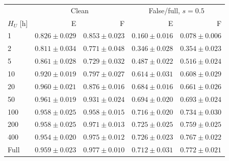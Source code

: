 \begin{tabular*}{\columnwidth}{@{\extracolsep{\fill}}lrrrr@{}}
\toprule
& \multicolumn{2}{c}{Clean} & \multicolumn{2}{c}{False/full, $s=0.5$} \\
$H_U$ [h] & E & F & E & F \\
\midrule
1 & $0.826\pm0.029$ & $0.853\pm0.023$ & $0.160\pm0.016$ & $0.078\pm0.006$ \\
2 & $0.811\pm0.034$ & $0.771\pm0.048$ & $0.346\pm0.028$ & $0.354\pm0.023$ \\
5 & $0.861\pm0.028$ & $0.729\pm0.032$ & $0.487\pm0.022$ & $0.516\pm0.024$ \\
10 & $0.920\pm0.019$ & $0.797\pm0.027$ & $0.614\pm0.031$ & $0.608\pm0.029$ \\
20 & $0.960\pm0.021$ & $0.876\pm0.016$ & $0.684\pm0.016$ & $0.661\pm0.026$ \\
50 & $0.961\pm0.019$ & $0.931\pm0.024$ & $0.694\pm0.020$ & $0.693\pm0.024$ \\
100 & $0.958\pm0.025$ & $0.958\pm0.015$ & $0.716\pm0.020$ & $0.734\pm0.030$ \\
200 & $0.958\pm0.025$ & $0.971\pm0.013$ & $0.725\pm0.025$ & $0.759\pm0.025$ \\
400 & $0.954\pm0.020$ & $0.975\pm0.012$ & $0.726\pm0.023$ & $0.767\pm0.022$ \\
\midrule
Full & $0.959\pm0.023$ & $0.977\pm0.010$ & $0.712\pm0.031$ & $0.772\pm0.021$ \\
\bottomrule
\end{tabular*}
